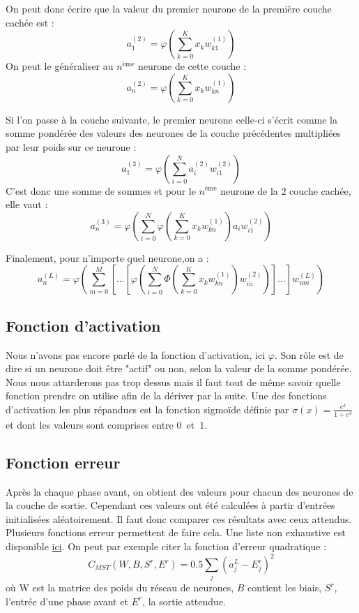 	On peut donc écrire que la valeur du premier neurone de la première couche cachée est : 
	$$a_1^{(2)} = \varphi\left(\sum_{k=0}^{K}x_kw_{k1}^{(1)}\right)$$
	On peut le généraliser au $n^{\text{ème}}$ neurone de cette couche :
	$$a_n^{(2)} = \varphi\left(\sum_{k=0}^{K}x_kw_{kn}^{(1)}\right)$$
	
	\noindent Si l'on passe à la couche suivante, le premier neurone celle-ci s'écrit comme la somme pondérée des valeurs des neurones de la couche précédentes multipliées par leur poids sur ce neurone : 
	$$a_1^{(3)}  = \varphi\left(\sum_{i=0}^{N}a_i^{(2)}w_{i1}^{(2)}\right)$$
	C'est donc une somme de sommes et pour le $n^{\text{ème}}$ neurone de la 2\ieme{} couche cachée, elle vaut :
	$$a_n^{(3)} = \varphi\left(\sum_{i=0}^{N}\varphi\left(\sum_{k=0}^{K}x_kw_{kn}^{(1)}\right)a_i w_{i1}^{(2)}\right)$$
	
	\noindent Finalement, pour n'importe quel neurone,on a :
	$$ a_n^{(L)} = \varphi\left(\sum_{m=0}^{M}\left[...\left[\varphi\left(\sum_{i=0}^{N}\varPhi\left(\sum_{k=0}^{K}x_kw_{kn}^{(1)}\right)w_{in}^{(2)}\right)\right]...\right]w_{nm}^{(L)}\right) $$
	
	
\subsection{Fonction d'activation}
	Nous n'avons pas encore parlé de la fonction d'activation, ici $\varphi$. Son rôle est de dire si un neurone doit être "actif" ou non, selon la valeur de la somme pondérée. Nous nous attarderons pas trop dessus mais il faut tout de même savoir quelle fonction prendre on utilise afin de la dériver par la suite. Une des fonctions d'activation les plus répandues est la fonction sigmoïde définie par $\sigma(x) = \frac{e^x}{1+e^x}$ et dont les valeurs sont comprises entre \mbox{$0$ et $1$.}
		
\subsection{Fonction erreur}
	Après la chaque phase avant, on obtient des valeurs pour chacun des neurones de la couche de sortie. Cependant ces valeurs ont été calculées à partir d'entrées initialisées aléatoirement. Il faut donc comparer ces résultats avec ceux attendus. Plusieurs fonctions erreur permettent de faire cela. Une liste non exhaustive est disponible \href{https://stats.stackexchange.com/questions/154879/a-list-of-cost-functions-used-in-neural-networks-alongside-applications}{ici}. On peut par exemple citer la fonction d'erreur quadratique : 
	$$C_{MST}(W, B, S^r, E^r) = 0.5\sum\limits_j (a^L_j - E^r_j)^2$$
	où W est la matrice des poids du réseau de neurones, $B$ contient les biais, $S^r$, l'entrée d'une phase avant et $E^r$, la sortie attendue.\\
	
